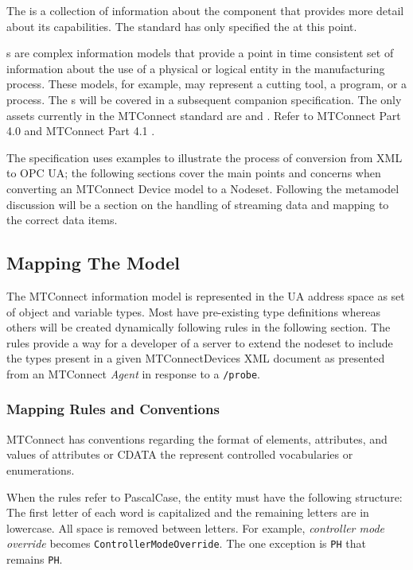 The  is a collection of information about the component that provides more detail about its capabilities. The standard has only specified the  at this point.

s are complex information models that provide a point in time consistent set of information about the use of a physical or logical entity in the manufacturing process. These models, for example, may represent a cutting tool, a program, or a process. The s will be covered in a subsequent companion specification. The only assets currently in the MTConnect standard are  and . Refer to MTConnect Part 4.0 \cite{MTCPart40} and MTConnect Part 4.1 \cite{MTCPart41}.

The specification uses examples to illustrate the process of conversion from XML to OPC UA; the following sections cover the main points and concerns when converting an MTConnect Device model to a Nodeset. Following the metamodel discussion will be a section on the handling of streaming data and mapping to the correct data items. 

\subsection{Mapping The Model}
\lstset{language=XML,numbers=left,xleftmargin=2em}

The MTConnect information model is represented in the UA address space as set of object and variable types. Most have pre-existing type definitions whereas others will be created dynamically following rules in the following section. The rules provide a way for a developer of a server to extend the nodeset to include the types present in a given MTConnectDevices XML document as presented from an MTConnect \textit{Agent} in response to a \texttt{/probe}.

\subsubsection{Mapping Rules and Conventions}\label{sec:mapping-rules}

MTConnect has conventions regarding the format of elements, attributes, and values of attributes or CDATA the represent controlled vocabularies or enumerations. 

When the rules refer to \gls{PascalCase}, the entity must have the following structure: The first letter of each word is capitalized and the remaining letters are in lowercase. All space is removed between letters. For example, \textit{controller mode override} becomes \texttt{Controller\-Mode\-Override}. The one exception is \texttt{PH} that remains \texttt{PH}.

